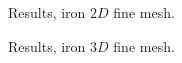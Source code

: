 %
\begin{figure}[h!]
    \centering 
    \caption{Results, iron $2D$ fine mesh.}
    \label{example-0112-iron-2D-fig}
\end{figure}
%
\begin{figure}[h!]
    \centering 
    \caption{Results, iron $3D$ fine mesh.}
    \label{example-0112-iron-3D-fig}
\end{figure}
